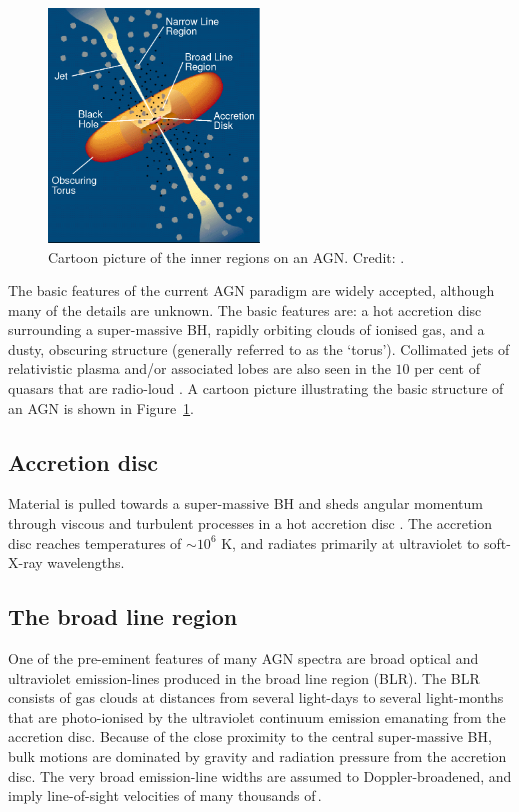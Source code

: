 \begin{figure}
  \centering
  \includegraphics[width=0.5\textwidth]{figures/chapter05/urry_model}
  \caption[{Illustration of the physical structure of an AGN in a simple orientation-based unification model.}]{Cartoon picture of the inner regions on an AGN. Credit: \citet{urry95}.}
  \label{fig:agnmodel}
\end{figure}

The basic features of the current AGN paradigm are widely accepted, although many of the details are unknown. 
The basic features are: a hot accretion disc surrounding a super-massive BH, rapidly orbiting clouds of ionised gas, and a dusty, obscuring structure (generally referred to as the `torus'). 
Collimated jets of relativistic plasma and/or associated lobes are also seen in the $10$ per cent of quasars that are radio-loud \citep[e.g.][]{peterson97}. 
A cartoon picture illustrating the basic structure of an AGN is shown in Figure~\ref{fig:agnmodel}. 

\subsection{Accretion disc}

Material is pulled towards a super-massive BH and sheds angular momentum through viscous and turbulent processes in a hot accretion disc \citep[e.g.][]{begelman85}. 
The accretion disc reaches temperatures of $\sim10^6$ K, and radiates primarily at ultraviolet to soft-X-ray wavelengths. 

\subsection{The broad line region}

One of the pre-eminent features of many AGN spectra are broad optical and ultraviolet emission-lines produced in the broad line region (BLR). 
The BLR consists of gas clouds at distances from several light-days to several light-months that are photo-ionised by the ultraviolet continuum emission emanating from the accretion disc.  
Because of the close proximity to the central super-massive BH, bulk motions are dominated by gravity and radiation pressure from the accretion disc.
The very broad emission-line widths are assumed to Doppler-broadened, and imply line-of-sight velocities of many thousands of\,\kms. 

